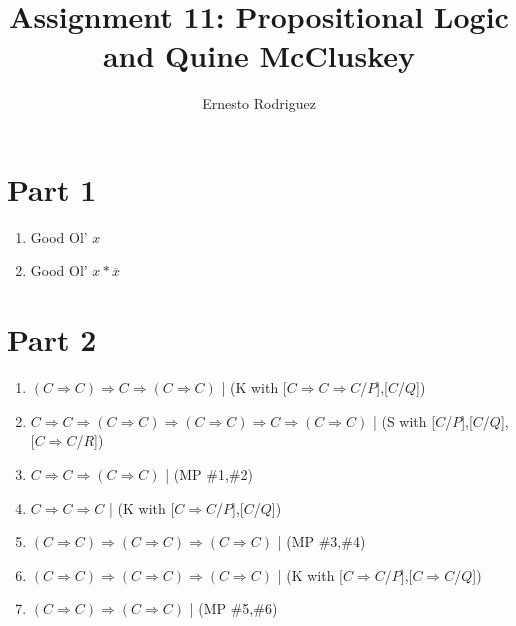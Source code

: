 \documentclass[11pt]{article}
\author{Ernesto Rodriguez}
\title{Assignment 11: Propositional Logic and Quine McCluskey}
\begin{document}
\maketitle
\section{Part 1}
\begin{enumerate}
  \item{Good Ol' $x$}
  \item{Good Ol' $x*\overline{x}$}
\end{enumerate}

\section{Part 2}
\begin{enumerate}
  \item{$(C\Rightarrow C)\Rightarrow C \Rightarrow (C\Rightarrow C)$ | (K with [$C \Rightarrow C\Rightarrow C$/$P$],[$C$/$Q$])}
  \item{$C \Rightarrow C \Rightarrow (C \Rightarrow C) \Rightarrow (C \Rightarrow C) \Rightarrow C \Rightarrow (C \Rightarrow C)$ | (S with [$C$/$P$],[$C$/$Q$],[$C\Rightarrow C$/$R$])}
  \item{$C \Rightarrow C \Rightarrow (C \Rightarrow C)$ | (MP \#1,\#2)}
  \item{$C \Rightarrow C \Rightarrow C$ | (K with [$C \Rightarrow C$/$P$],[$C$/$Q$])}
  \item{$(C\Rightarrow C)\Rightarrow (C\Rightarrow C) \Rightarrow (C \Rightarrow C)$ | (MP \#3,\#4)}
  \item{$(C\Rightarrow C)\Rightarrow (C\Rightarrow C) \Rightarrow (C \Rightarrow C)$ | (K with [$C \Rightarrow C$/$P$],[$C \Rightarrow C$/$Q$])}
  \item{$(C\Rightarrow C)\Rightarrow (C \Rightarrow C)$ | (MP \#5,\#6)}
\end{enumerate}
\end{document}
